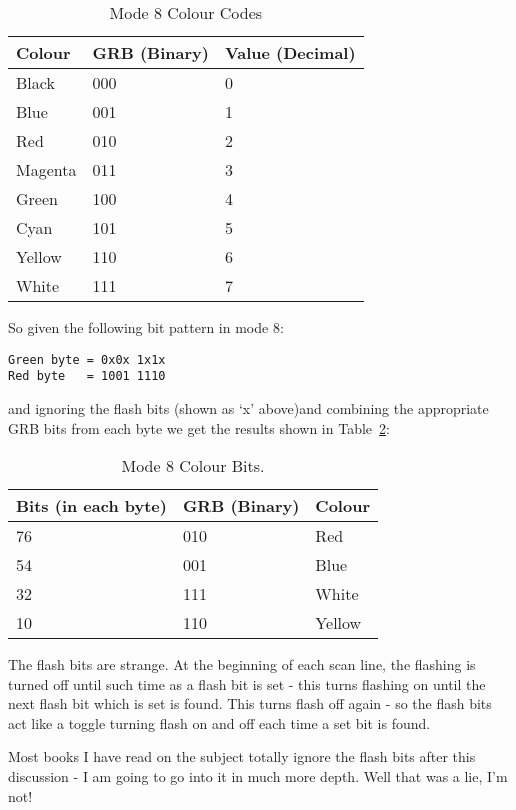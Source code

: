 \begin{table}[htbp]
\centering
\begin{tabular}{l l l}
\toprule
\textbf{Colour} & \textbf{GRB (Binary)} & \textbf{Value (Decimal)}  \\
\midrule
%
Black & 000 & 0 \\
Blue  & 001 & 1 \\
Red   & 010 & 2 \\
Magenta & 011 & 3 \\
Green & 100 & 4 \\
Cyan & 101 & 5 \\
Yellow & 110 & 6 \\
White & 111 & 7 \\
%
\bottomrule
\end{tabular}
\caption{Mode 8 Colour Codes}
\label{tab:Mode8ColourCodes}
\end{table}

So given the following bit pattern in mode 8:

\begin{lstlisting}[frame=none,numbers=none]
Green byte = 0x0x 1x1x 
Red byte   = 1001 1110
\end{lstlisting}

and ignoring the flash bits (shown as `x' above)and combining the
    appropriate GRB bits from each byte we get the results shown in Table~\ref{tab:Mode8ColourBits}:


\begin{table}[htbp]
\centering
\begin{tabular}{l l l}
\toprule
\textbf{Bits (in each byte)} & \textbf{GRB (Binary)} & \textbf{Colour}  \\
\midrule
%
76 & 010 & Red \\
54 & 001 & Blue \\
32 & 111 & White \\
10 & 110 & Yellow \\
%
\bottomrule
\end{tabular}
\caption{Mode 8 Colour Bits.}
\label{tab:Mode8ColourBits}
\end{table}

The flash bits are strange. At the beginning of each scan line, the
    flashing is turned off until such time as a flash bit is set -{} this turns
    flashing on until the next flash bit which is set is found. This turns
    flash off again -{} so the flash bits act like a toggle turning flash on and
    off each time a set bit is found.

\begin{note}
Most books I have read on the subject totally ignore the flash
      bits after this discussion -{} I am going to go into it in much more
      depth. Well that was a lie, I'm not!
\end{note}

